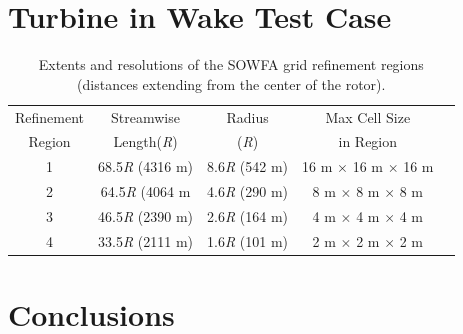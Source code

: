 \section{Turbine in Wake Test Case} \label{section6-7}

\begin{table} \label{Table6-2}
\centering
\caption{ Extents and resolutions of the SOWFA grid refinement regions (distances extending from the center of the rotor).}
\begin{tabular}{c c c c c}
\hline
Refinement & Streamwise       & Radius     & Max Cell Size\\
Region     & Length(\emph{R}) & (\emph{R}) &  in Region\\
\hline
1          & 68.5\emph{R} (4316 m)  & 8.6\emph{R} (542 m) & 16 m $\times$ 16 m $\times$ 16 m\\
2          & 64.5\emph{R} (4064 m   & 4.6\emph{R} (290 m) & 8 m $\times$ 8 m $\times$ 8 m\\
3          & 46.5\emph{R} (2390 m)  & 2.6\emph{R} (164 m) & 4 m $\times$ 4 m $\times$ 4 m\\
4          & 33.5\emph{R} (2111 m)  & 1.6\emph{R} (101 m) & 2 m $\times$ 2 m $\times$ 2 m\\
\hline
\end{tabular}
\end{table}


\section{Conclusions} \label{section6-8}

